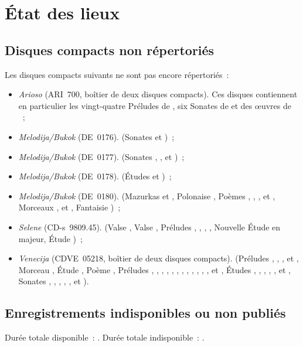 \chapter[%
État des lieux][%
État des lieux]{%
État des lieux}
\label{chap:Etat-des-lieux}

\section{Disques compacts non répertoriés}
\label{sec:Nonrepertorie}

Les disques compacts suivants ne sont pas encore répertoriés~:
\begin{itemize}
 \item
 \emph{Arioso} (ARI~700, boîtier de deux disques compacts).
 Ces disques contiennent en particulier les vingt-quatre Préludes 
 de \Chopin{}, six Sonates de \Scriabine{} et des œuvres de \Liadov{}~;
 \item
 \emph{Melodija/Bukok} (DE~0176).
 \Scriabine{} (Sonates  et )~;
 \item
 \emph{Melodija/Bukok} (DE~0177).
 \Scriabine{} (Sonates , ,  et )~;
 \item
 \emph{Melodija/Bukok} (DE~0178).
 \Scriabine{} (Études   et  )~;
 \item
 \emph{Melodija/Bukok} (DE~0180).
 \Scriabine{} (Mazurkas   et  ,
 Polonaise , Poèmes  ,  ,
 ,  et , Morceaux  , 
  et  , Fantaisie )~;
 \item
 \emph{Selene} (\hbox{CD-s}~9809.45).
 \Chopin{} (Valse  , Valse  , Préludes
  ,  ,  ,
  , Nouvelle Étude en \kA \Flat majeur, Étude 
 )~;
 \item
 \emph{Venecija} (CDVE~05218, boîtier de deux disques compacts).
 \Scriabine{} (Préludes  ,  ,
  ,   et  ,
 Morceau  , Étude  , Poème 
 , Préludes  ,  , 
 ,  ,  , 
 ,  ,  , 
 ,  ,  , 
 ,   et  , Études
  ,  ,  , 
 ,  ,   et 
 , Sonates , , , , ,
  et ).
\end{itemize}

\section{Enregistrements indisponibles ou non publiés}
\label{sec:IndisponibleNonpublie}

Durée totale disponible~: \availabletotaltime.
Durée totale indisponible~: \unavailabletotaltime.
